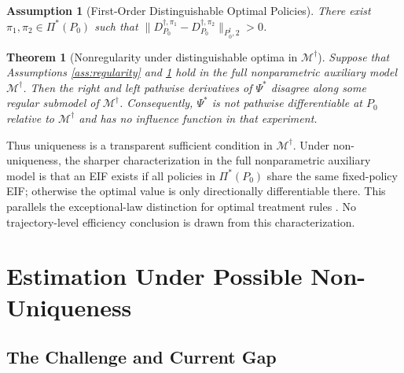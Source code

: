 \documentclass[12pt]{article}
\newtheorem{theorem}{Theorem}[section]
\newtheorem{assumption}{Assumption}
\theoremstyle{remark}\newtheorem{remark}[theorem]{Remark}\theoremstyle{plain}
\begin{document}
\begin{assumption}[First-Order Distinguishable Optimal Policies]
\label{ass:unres_rules}
    There exist $\pi_1,\pi_2\in\Pi^*(P_0)$ such that
    $\|D_{P_0}^{\dagger,\pi_1}
    -D_{P_0}^{\dagger,\pi_2}\|_{P_0^\dagger,2}>0$.
\end{assumption}

\begin{theorem}[Nonregularity under distinguishable optima in
$\mathcal M^\dagger$]
\label{thm:nec_cond_for_EIF}
    Suppose that Assumptions \ref{ass:regularity} and
    \ref{ass:unres_rules} hold in the full
    nonparametric auxiliary model $\mathcal M^\dagger$.  Then the
    right and left pathwise derivatives of $\Psi^*$ disagree along
    some regular submodel of $\mathcal M^\dagger$.  Consequently,
    $\Psi^*$ is not pathwise differentiable at $P_0$ relative to
    $\mathcal M^\dagger$ and has no influence function in that
    experiment.
\end{theorem}

Thus uniqueness is a transparent sufficient condition in
$\mathcal M^\dagger$.  Under non-uniqueness, the sharper
characterization in the full nonparametric auxiliary model is that an
EIF exists if all policies in $\Pi^*(P_0)$ share the same
fixed-policy EIF; otherwise the optimal value is only directionally
differentiable there.  This parallels the exceptional-law distinction
for optimal treatment rules \citep{luedtke2016statistical}.  No
trajectory-level efficiency conclusion is drawn from this
characterization.

\section{Estimation Under Possible Non-Uniqueness}\label{sec:est}

\subsection{The Challenge and Current Gap}
\end{document}
